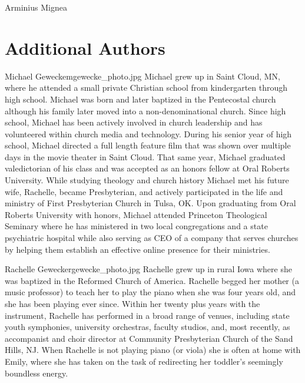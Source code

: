\begin{authorbio}{Arminius Mignea}{}

\end{authorbio}


\section*{Additional Authors}



\begin{authorbio}{Michael Gewecke}{mgewecke_photo.jpg}
Michael grew up in Saint Cloud, MN, where he attended a small private Christian school from kindergarten through high school.   Michael was born and later baptized in the Pentecostal church although his family later moved into a non-denominational church.   Since high school, Michael has been actively involved in church leadership and has volunteered within church media and technology.  During his senior year of high school, Michael directed a full length feature film that was shown over multiple days in the movie theater in Saint Cloud.  That same year, Michael graduated valedictorian of his class and was accepted as an honors fellow at Oral Roberts University.  While studying theology and church history Michael met his future wife, Rachelle, became Presbyterian, and actively participated in the life and ministry of First Presbyterian Church in Tulsa, OK.  Upon graduating from Oral Roberts University with honors, Michael attended Princeton Theological Seminary where he has ministered in two local congregations and a state psychiatric hospital while also serving as CEO of a company that serves churches by helping them establish an effective online presence for their ministries.  
\end{authorbio}

\begin{authorbio}{Rachelle Gewecke}{rgewecke_photo.jpg}
Rachelle grew up in rural Iowa where she was baptized in the Reformed Church of America.  Rachelle begged her mother (a music professor) to teach her to play the piano when she was four years old, and she has been playing ever since.  Within her twenty plus years with the instrument, Rachelle has performed in a broad range of venues, including state youth symphonies, university orchestras, faculty studios, and, most recently, as accompanist and choir director at Community Presbyterian Church of the Sand Hills, NJ.  When Rachelle is not playing piano (or viola) she is often at home with Emily, where she has taken on the task of redirecting her toddler’s seemingly boundless energy.
\end{authorbio}

